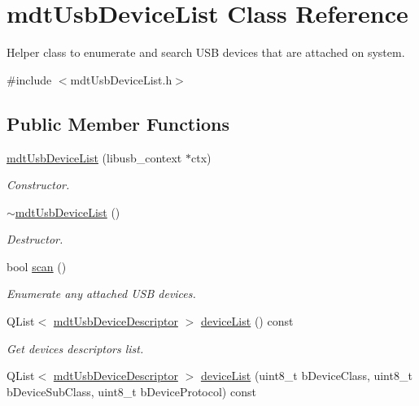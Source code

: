 \hypertarget{classmdt_usb_device_list}{\section{mdt\-Usb\-Device\-List Class Reference}
\label{classmdt_usb_device_list}
}


Helper class to enumerate and search U\-S\-B devices that are attached on system.  




{\ttfamily \#include $<$mdt\-Usb\-Device\-List.\-h$>$}

\subsection*{Public Member Functions}
\begin{DoxyCompactItemize}
\item 
\hyperlink{classmdt_usb_device_list_a162373e9159ceb55615fa17049ab958a}{mdt\-Usb\-Device\-List} (libusb\-\_\-context $\ast$ctx)
\begin{DoxyCompactList}\small\item\em Constructor. \end{DoxyCompactList}\item 
\hyperlink{classmdt_usb_device_list_acd0fd4e79b3c9f2eb96105ede458447d}{$\sim$mdt\-Usb\-Device\-List} ()
\begin{DoxyCompactList}\small\item\em Destructor. \end{DoxyCompactList}\item 
bool \hyperlink{classmdt_usb_device_list_a21b4ab508329779b07bae7859097b955}{scan} ()
\begin{DoxyCompactList}\small\item\em Enumerate any attached U\-S\-B devices. \end{DoxyCompactList}\item 
Q\-List$<$ \hyperlink{classmdt_usb_device_descriptor}{mdt\-Usb\-Device\-Descriptor} $>$ \hyperlink{classmdt_usb_device_list_ad18027a6b34790e2b907f37755612fe3}{device\-List} () const 
\begin{DoxyCompactList}\small\item\em Get devices descriptors list. \end{DoxyCompactList}\item 
Q\-List$<$ \hyperlink{classmdt_usb_device_descriptor}{mdt\-Usb\-Device\-Descriptor} $>$ \hyperlink{classmdt_usb_device_list_acdec1d6cab615f8cfa8a07eff8b0f9e0}{device\-List} (uint8\-\_\-t b\-Device\-Class, uint8\-\_\-t b\-Device\-Sub\-Class, uint8\-\_\-t b\-Device\-Protocol) const 

\end{DoxyCompactItemize}
